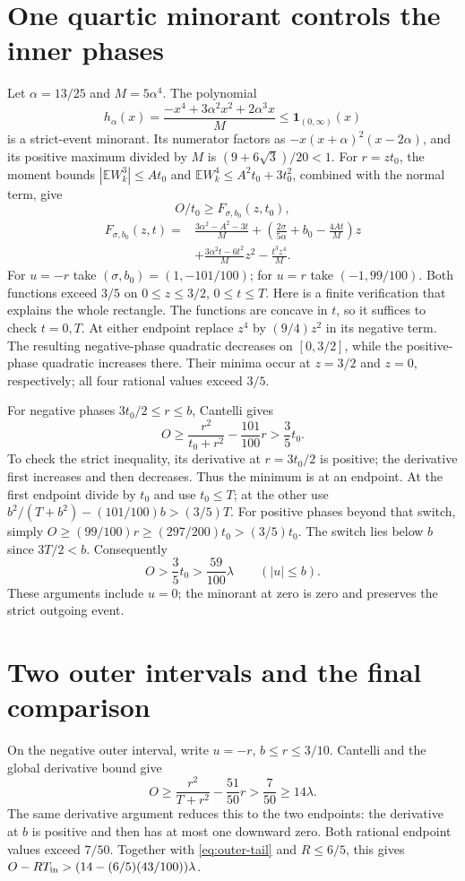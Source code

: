\documentclass[11pt]{article}
\newcommand{\E}{\mathbb E}\newcommand{\Pp}{\mathbb P}
\begin{document}
\section{One quartic minorant controls the inner phases}
Let $\alpha=13/25$ and $M=5\alpha^4$. The polynomial
\[
 h_\alpha(x)=\frac{-x^4+3\alpha^2x^2+2\alpha^3x}{M}
                      \le\mathbf1_{(0,\infty)}(x)
\]
is a strict-event minorant. Its numerator factors as
$-x(x+\alpha)^2(x-2\alpha)$, and its positive maximum divided by $M$
is $(9+6\sqrt3)/20<1$.
For $r=zt_0$, the moment bounds $|\E W_k^3|\le At_0$ and
$\E W_k^4\le A^2t_0+3t_0^2$, combined with the normal term, give
\[
 O/t_0\ge F_{\sigma,b_0}(z,t_0),
\]
\begin{align*}
F_{\sigma,b_0}(z,t)={}&\frac{3\alpha^2-A^2-3t}{M}
 +\left(\frac{2\sigma}{5\alpha}+b_0-\frac{4At}{M}\right)z\\
 &+\frac{3\alpha^2t-6t^2}{M}z^2-\frac{t^3z^4}{M}.
\end{align*}
For $u=-r$ take $(\sigma,b_0)=(1,-101/100)$; for $u=r$ take
$(-1,99/100)$. Both functions exceed $3/5$ on
$0\le z\le3/2$, $0\le t\le T$.
Here is a finite verification that explains the whole rectangle.
The functions are concave in $t$, so it suffices to check $t=0,T$.
At either endpoint replace $z^4$ by $(9/4)z^2$ in its negative term.
The resulting negative-phase quadratic decreases on $[0,3/2]$, while
the positive-phase quadratic increases there. Their minima occur at
$z=3/2$ and $z=0$, respectively; all four rational values exceed $3/5$.

For negative phases $3t_0/2\le r\le b$, Cantelli gives
\[
 O\ge\frac{r^2}{t_0+r^2}-\frac{101}{100}r>\frac35t_0.
\]
To check the strict inequality, its derivative at $r=3t_0/2$ is positive;
the derivative first increases and then decreases. Thus the minimum is at
an endpoint. At the first endpoint divide by $t_0$ and use $t_0\le T$;
at the other use $b^2/(T+b^2)-(101/100)b>(3/5)T$.
For positive phases beyond that switch, simply
$O\ge(99/100)r\ge(297/200)t_0>(3/5)t_0$.
The switch lies below $b$ since $3T/2<b$. Consequently
\begin{equation}\label{eq:own}
                  O>\frac35t_0>\frac{59}{100}\lambda
                     \qquad(|u|\le b).
\end{equation}
These arguments include $u=0$; the minorant at zero is zero and preserves
the strict outgoing event.

\section{Two outer intervals and the final comparison}
On the negative outer interval, write $u=-r$, $b\le r\le3/10$.
Cantelli and the global derivative bound give
\[
 O\ge\frac{r^2}{T+r^2}-\frac{51}{50}r>\frac7{50}\ge14\lambda.
\]
The same derivative argument reduces this to the two endpoints: the
derivative at $b$ is positive and then has at most one downward zero.
Both rational endpoint values exceed $7/50$.
Together with \eqref{eq:outer-tail} and $R\le6/5$, this gives
$O-RT_{\rm in}>(14-(6/5)(43/100))\lambda$.
\end{document}
